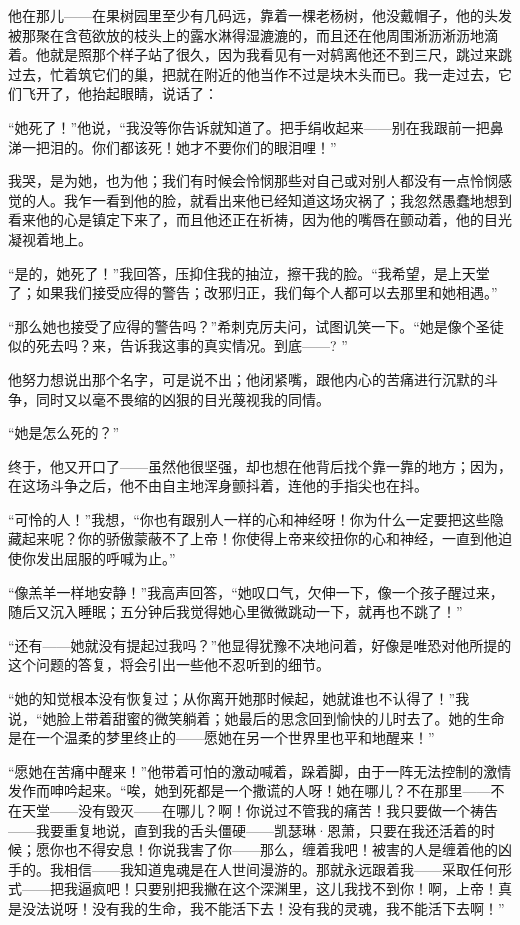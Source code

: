 \par 他在那儿——在果树园里至少有几码远，靠着一棵老杨树，他没戴帽子，他的头发被那聚在含苞欲放的枝头上的露水淋得湿漉漉的，而且还在他周围淅沥淅沥地滴着。他就是照那个样子站了很久，因为我看见有一对鸫离他还不到三尺，跳过来跳过去，忙着筑它们的巢，把就在附近的他当作不过是块木头而已。我一走过去，它们飞开了，他抬起眼睛，说话了：
\par “她死了！”他说，“我没等你告诉就知道了。把手绢收起来——别在我跟前一把鼻涕一把泪的。你们都该死！她才不要你们的眼泪哩！”
\par 我哭，是为她，也为他；我们有时候会怜悯那些对自己或对别人都没有一点怜悯感觉的人。我乍一看到他的脸，就看出来他已经知道这场灾祸了；我忽然愚蠢地想到看来他的心是镇定下来了，而且他还正在祈祷，因为他的嘴唇在颤动着，他的目光凝视着地上。
\par “是的，她死了！”我回答，压抑住我的抽泣，擦干我的脸。“我希望，是上天堂了；如果我们接受应得的警告；改邪归正，我们每个人都可以去那里和她相遇。”
\par “那么她也接受了应得的警告吗？”希刺克厉夫问，试图讥笑一下。“她是像个圣徒似的死去吗？来，告诉我这事的真实情况。到底——? ”
\par 他努力想说出那个名字，可是说不出；他闭紧嘴，跟他内心的苦痛进行沉默的斗争，同时又以毫不畏缩的凶狠的目光蔑视我的同情。
\par “她是怎么死的？”
\par 终于，他又开口了——虽然他很坚强，却也想在他背后找个靠一靠的地方；因为，在这场斗争之后，他不由自主地浑身颤抖着，连他的手指尖也在抖。
\par “可怜的人！”我想，“你也有跟别人一样的心和神经呀！你为什么一定要把这些隐藏起来呢？你的骄傲蒙蔽不了上帝！你使得上帝来绞扭你的心和神经，一直到他迫使你发出屈服的呼喊为止。”
\par “像羔羊一样地安静！”我高声回答，“她叹口气，欠伸一下，像一个孩子醒过来，随后又沉入睡眠；五分钟后我觉得她心里微微跳动一下，就再也不跳了！”
\par “还有——她就没有提起过我吗？”他显得犹豫不决地问着，好像是唯恐对他所提的这个问题的答复，将会引出一些他不忍听到的细节。
\par “她的知觉根本没有恢复过；从你离开她那时候起，她就谁也不认得了！”我说，“她脸上带着甜蜜的微笑躺着；她最后的思念回到愉快的儿时去了。她的生命是在一个温柔的梦里终止的——愿她在另一个世界里也平和地醒来！”
\par “愿她在苦痛中醒来！”他带着可怕的激动喊着，跺着脚，由于一阵无法控制的激情发作而呻吟起来。“唉，她到死都是一个撒谎的人呀！她在哪儿？不在那里——不在天堂——没有毁灭——在哪儿？啊！你说过不管我的痛苦！我只要做一个祷告——我要重复地说，直到我的舌头僵硬——凯瑟琳·恩萧，只要在我还活着的时候；愿你也不得安息！你说我害了你——那么，缠着我吧！被害的人是缠着他的凶手的。我相信——我知道鬼魂是在人世间漫游的。那就永远跟着我——采取任何形式——把我逼疯吧！只要别把我撇在这个深渊里，这儿我找不到你！啊，上帝！真是没法说呀！没有我的生命，我不能活下去！没有我的灵魂，我不能活下去啊！”

